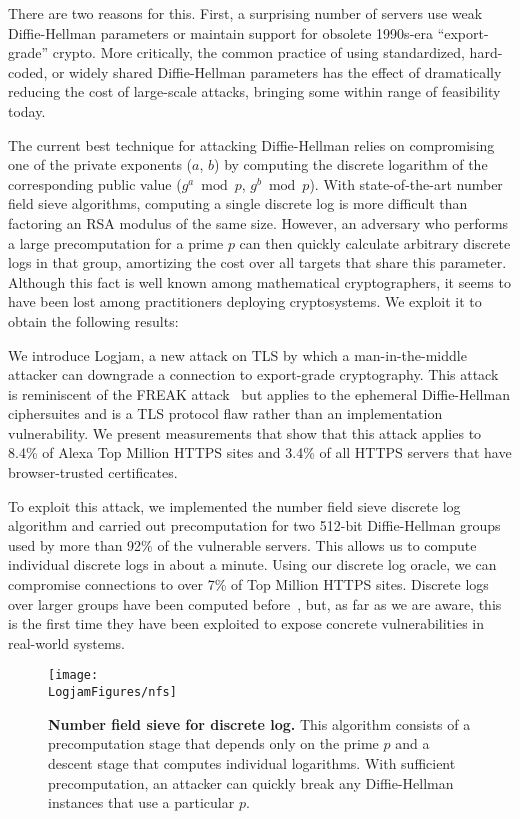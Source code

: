 There are two reasons for this. First, a surprising number of servers
use weak Diffie-Hellman parameters or maintain support for obsolete
1990s-era ``export-grade'' crypto. More critically, the common practice of
using standardized, hard-coded, or widely shared Diffie-Hellman
parameters has the effect of dramatically reducing the cost of
large-scale attacks, bringing some within range of feasibility
today.

The current best technique for attacking Diffie-Hellman relies on
compromising one of the private exponents ($a$, $b$) by
computing the discrete logarithm of the corresponding public value ($g^a
\bmod p$, $g^b \bmod p$).  With state-of-the-art number field sieve
algorithms, computing a single discrete log is more difficult than
factoring an RSA modulus of the same size.
However, an adversary who performs
a large precomputation for a prime $p$ can then quickly calculate
arbitrary discrete logs in that group, amortizing the cost over all
targets that share this parameter.
Although this fact is well known
among mathematical cryptographers, it seems to have been lost among
practitioners deploying cryptosystems.  We exploit it to
obtain the following results:

  We introduce Logjam, a new
attack on TLS by which a man-in-the-middle attacker can downgrade a
connection to export-grade cryptography. This attack is reminiscent of
the FREAK attack~\cite{beurdouche2015messy} but applies to the
ephemeral Diffie-Hellman ciphersuites and is a TLS protocol flaw
rather than an implementation vulnerability.
We present measurements that show that this attack applies
to 8.4\% of Alexa Top Million HTTPS sites and 3.4\% of all
HTTPS servers that have browser-trusted certificates.

To exploit this attack, we implemented the number field sieve discrete log algorithm
and carried out precomputation for two 512-bit
Diffie-Hellman groups used by more than 92\% of the vulnerable servers.
This allows us to compute individual discrete logs in about a minute.
Using our discrete log oracle, we can compromise connections
to over 7\% of Top Million HTTPS sites.
Discrete logs over larger groups have been computed before~\cite{dlp180},
but, as far as we are aware, this is the first time they have been exploited
to expose concrete vulnerabilities in real-world systems.


\begin{figure*}[ht]
\centering\texttt{[image: \\LogjamFigures/nfs]}
\caption{\label{fig:nfs}\textbf{Number field sieve for
    discrete log.} This algorithm consists of a precomputation stage that depends only
  on the prime $p$ and a descent stage that computes individual logarithms.
  With sufficient precomputation, an attacker can
  quickly break any Diffie-Hellman instances that use a particular
  $p$.}
\end{figure*}

